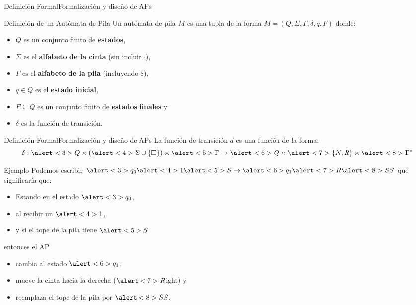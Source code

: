 \documentclass[spanish]{beamer}
\begin{document}
\begin{frame}{Definición Formal}{Formalización y diseño de APs}
    \begin{block}{Definición de un Autómata de Pila}
        Un autómata de pila $M$ es una tupla de la forma $M = (Q, \Sigma, \Gamma, \delta, q, F)$ donde: \pause
        \begin{itemize}
            \item $Q$ es un conjunto finito de \textbf{estados}, \pause
            \item $\Sigma$ es el \textbf{alfabeto de la cinta} (sin incluir $\square$), \pause
            \item $\Gamma$ es el \textbf{alfabeto de la pila} (incluyendo $\$$), \pause
            \item $q \in Q$ es el \textbf{estado inicial}, \pause
            \item $F \subseteq Q$ es un conjunto finito de \textbf{estados finales} y \pause
            \item $\delta$ es la función de transición.
        \end{itemize}
    \end{block}
\end{frame}

\begin{frame}{Definición Formal}{Formalización y diseño de APs}
    La función de transición $d$ es una función de la forma:
        \[\delta : \alert<3>{Q} \times (\alert<4>{\Sigma \cup \{\square\}}) \times \alert<5>{\Gamma} \to \alert<6>{Q} \times \alert<7>{\{N,R\}} \times \alert<8>{\Gamma^*}\] \pause
        \vspace{-1.5ex}
    \begin{exampleblock}{Ejemplo}
        Podemos escribir $\alert<3>{q_0} \alert<4>{1} \alert<5>{S} \to \alert<6>{q_1} \alert<7>{R} \alert<8>{SS}$ que significaría que: \pause
        \begin{itemize}
            \item Estando en el estado $\alert<3>{q_0}$, \pause
            \item al recibir un $\alert<4>{1}$, \pause
            \item y si el tope de la pila tiene $\alert<5>{S}$ \pause
        \end{itemize}
        entonces el AP
        \begin{itemize}
            \item cambia al estado $\alert<6>{q_1}$, \pause
            \item mueve la cinta hacia la derecha ($\alert<7>{R}$ight) y \pause
            \item reemplaza el tope de la pila por $\alert<8>{SS}$.
        \end{itemize}
    \end{exampleblock}
\end{frame}
\end{document}
